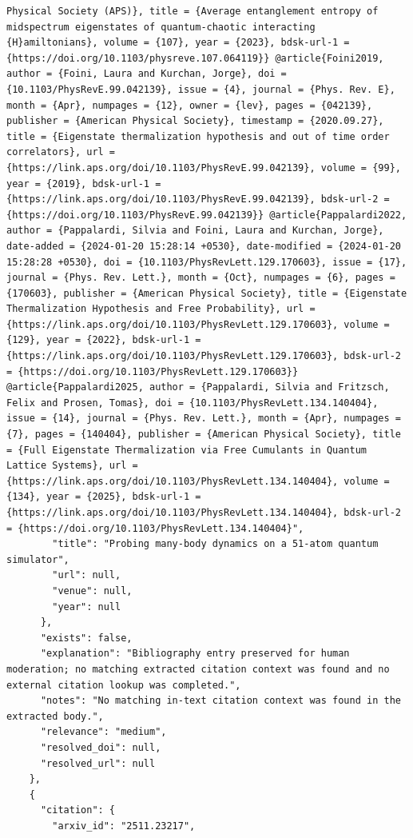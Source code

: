 \documentclass[11pt]{article}
\begin{document}
\begin{verbatim}
Physical Society (APS)}, title = {Average entanglement entropy of midspectrum eigenstates of quantum-chaotic interacting {H}amiltonians}, volume = {107}, year = {2023}, bdsk-url-1 = {https://doi.org/10.1103/physreve.107.064119}} @article{Foini2019, author = {Foini, Laura and Kurchan, Jorge}, doi = {10.1103/PhysRevE.99.042139}, issue = {4}, journal = {Phys. Rev. E}, month = {Apr}, numpages = {12}, owner = {lev}, pages = {042139}, publisher = {American Physical Society}, timestamp = {2020.09.27}, title = {Eigenstate thermalization hypothesis and out of time order correlators}, url = {https://link.aps.org/doi/10.1103/PhysRevE.99.042139}, volume = {99}, year = {2019}, bdsk-url-1 = {https://link.aps.org/doi/10.1103/PhysRevE.99.042139}, bdsk-url-2 = {https://doi.org/10.1103/PhysRevE.99.042139}} @article{Pappalardi2022, author = {Pappalardi, Silvia and Foini, Laura and Kurchan, Jorge}, date-added = {2024-01-20 15:28:14 +0530}, date-modified = {2024-01-20 15:28:28 +0530}, doi = {10.1103/PhysRevLett.129.170603}, issue = {17}, journal = {Phys. Rev. Lett.}, month = {Oct}, numpages = {6}, pages = {170603}, publisher = {American Physical Society}, title = {Eigenstate Thermalization Hypothesis and Free Probability}, url = {https://link.aps.org/doi/10.1103/PhysRevLett.129.170603}, volume = {129}, year = {2022}, bdsk-url-1 = {https://link.aps.org/doi/10.1103/PhysRevLett.129.170603}, bdsk-url-2 = {https://doi.org/10.1103/PhysRevLett.129.170603}} @article{Pappalardi2025, author = {Pappalardi, Silvia and Fritzsch, Felix and Prosen, Tomas}, doi = {10.1103/PhysRevLett.134.140404}, issue = {14}, journal = {Phys. Rev. Lett.}, month = {Apr}, numpages = {7}, pages = {140404}, publisher = {American Physical Society}, title = {Full Eigenstate Thermalization via Free Cumulants in Quantum Lattice Systems}, url = {https://link.aps.org/doi/10.1103/PhysRevLett.134.140404}, volume = {134}, year = {2025}, bdsk-url-1 = {https://link.aps.org/doi/10.1103/PhysRevLett.134.140404}, bdsk-url-2 = {https://doi.org/10.1103/PhysRevLett.134.140404}",
        "title": "Probing many-body dynamics on a 51-atom quantum simulator",
        "url": null,
        "venue": null,
        "year": null
      },
      "exists": false,
      "explanation": "Bibliography entry preserved for human moderation; no matching extracted citation context was found and no external citation lookup was completed.",
      "notes": "No matching in-text citation context was found in the extracted body.",
      "relevance": "medium",
      "resolved_doi": null,
      "resolved_url": null
    },
    {
      "citation": {
        "arxiv_id": "2511.23217",

\end{verbatim}
\end{document}
